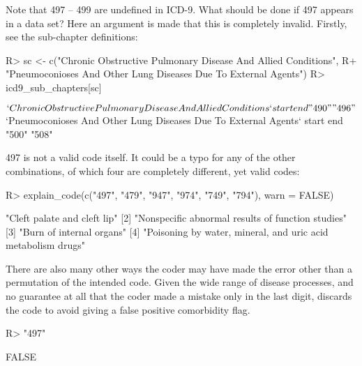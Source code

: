 \documentclass[article]{jss}
\begin{document}
Note that 497 -- 499 are undefined in ICD-9. What should be done if 497
appears in a data set? Here an argument is made that this is completely
invalid. Firstly, see the sub-chapter definitions:

\begin{CodeChunk}

\begin{CodeInput}
R> sc <- c("Chronic Obstructive Pulmonary Disease And Allied Conditions",
R+         "Pneumoconioses And Other Lung Diseases Due To External Agents")
R> icd9_sub_chapters[sc]
\end{CodeInput}

\begin{CodeOutput}
$`Chronic Obstructive Pulmonary Disease And Allied Conditions`
start   end 
"490" "496" 

$`Pneumoconioses And Other Lung Diseases Due To External Agents`
start   end 
"500" "508" 
\end{CodeOutput}
\end{CodeChunk}

497 is not a valid code itself. It could be a typo for any of the other
combinations, of which four are completely different, yet valid codes:

\begin{CodeChunk}

\begin{CodeInput}
R> explain_code(c("497", "479", "947", "974", "749", "794"), warn = FALSE)
\end{CodeInput}

\begin{CodeOutput}
[1] "Cleft palate and cleft lip"                                 
[2] "Nonspecific abnormal results of function studies"           
[3] "Burn of internal organs"                                    
[4] "Poisoning by water, mineral, and uric acid metabolism drugs"
\end{CodeOutput}
\end{CodeChunk}

There are also many other ways the coder may have made the error other
than a permutation of the intended code. Given the wide range of disease
processes, and no guarantee at all that the coder made a mistake only in
the last digit,  discards the code to avoid giving a false
positive comorbidity flag.

\begin{CodeChunk}

\begin{CodeInput}
R> "497" %
\end{CodeInput}

\begin{CodeOutput}
[1] FALSE
\end{CodeOutput}
\end{CodeChunk}
\end{document}
